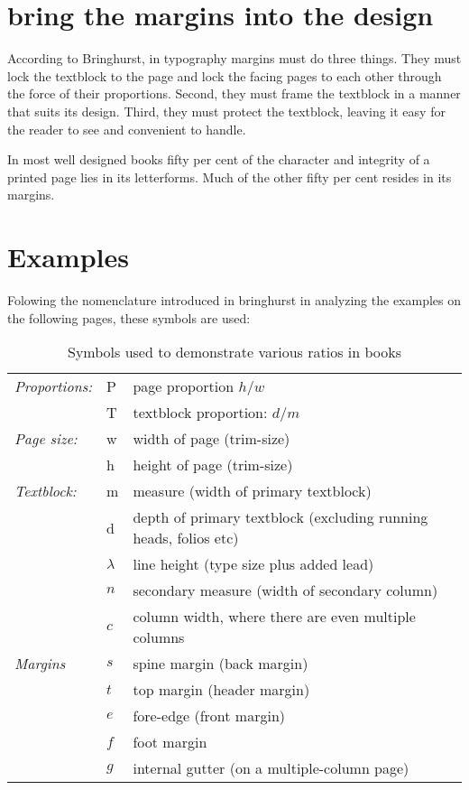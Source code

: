 \section{bring the margins into the design}

According to Bringhurst\cite{bringhurst2005}, in typography margins must do three things. They must lock the
textblock to the page and lock the facing pages to each other through the force of their proportions. Second, they must frame the textblock
in a manner that suits its design. Third, they must protect the textblock, leaving it easy for the reader to see and convenient to handle. 

In most well designed books fifty per cent of the character and integrity of a printed page lies in its letterforms. Much of the other fifty per cent resides in its margins.

\section{Examples}
Folowing the nomenclature introduced in bringhurst in analyzing the examples on the following pages, 
these symbols are used:

\begin{table}[htbp]
\begin{tabular}{l l @{ = } p{6cm}}
\textit{Proportions:}      &P  &  page proportion $h/w$\\
~                      &T &  textblock proportion: $d/m$\\
\textit{Page size:}         &w &  width of page (trim-size)\\
~                      &h  & height of page (trim-size)\\
\textit{Textblock:}           &m & measure (width of primary textblock)\\
~                      &d  & depth of primary textblock (excluding running heads, folios etc)\\                      
~                      &$\lambda$ & line height (type size plus added lead)\\
~                      &$n$ & secondary measure (width of secondary column)\\
~                      &$c$  & column width, where there are even multiple columns\\
\textit{Margins}  &$s$  & spine margin (back margin)\\
~                      &$t$   & top margin (header margin)\\
                        &$e$  & fore-edge (front margin)\\
                        &$f$   & foot margin\\
                        &$g$  & internal gutter (on a multiple-column page)\\
\end{tabular}
\caption{Symbols used to demonstrate various ratios in books}
\end{table}
\medskip


